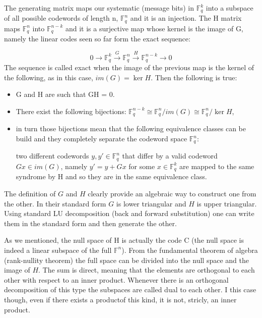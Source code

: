 \begin{info}
The generating matrix maps our systematic (message bits) in $\mathbb{F}_{q}^{k}$ into a subspace of all possible codewords of length n, $\mathbb{F}_{q}^{n}$  and it is an injection. The H matrix maps $\mathbb{F}_{q}^{n}$ into $\mathbb{F}_{q}^{n-k}$ and it is a surjective map whose kernel is the image of G, namely the linear codes seen so far form the exact sequence: 

\begin{equation}
	0 \rightarrow \mathbb{F}_{q}^{k} \xrightarrow{G} \mathbb{F}_{q}^{n} \xrightarrow{H} \mathbb{F}_{q}^{n-k} \longrightarrow 0
\end{equation}
The sequence is called exact when the image of the previous map is the kernel of the following, as in this case, $im(G) = \ker H$. Then the following is true:
\begin{itemize}
	\item G and H are such that GH = 0.
	\item There exist the following bijections: $\mathbb{F}_{q}^{n - k} \cong \mathbb{F}_{q}^{n} / im(G) \cong \mathbb{F}_{q}^{n} / \ker H$,
	\item in turn those bijections mean that the following equivalence classes can be build and they completely separate the codeword space $\mathbb{F}_{q}^{n}$:
	
	two different codewords $y, y\prime \in \mathbb{F}_{q}^{n}$ that differ by a valid codeword $Gx \in im(G)$, namely $y\prime = y + Gx$ for some $x\in \mathbb{F}_{q}^{k}$ are mapped to the same syndrome by H and so they are in the same equivalence class.    
\end{itemize}

\end{info}

The definition of $G$ and $H$ clearly provide an algebraic way to construct one from the other. In their standard form $G$ is lower triangular and $H$ is upper triangular. Using standard LU decomposition (back and forward substitution) one can write them in the standard form and then generate the other. 

\begin{info}
	As we mentioned, the null space of H is actually the code C (the null space is indeed a linear subspace of the full $\mathbb{F}^n$). From the fundamental theorem of algebra (rank-nullity theorem) the full space can be divided into the null space and the image of $H$. The sum is direct, meaning that the elements are orthogonal to each other with respect to an inner product. Whenever there is an orthogonal decomposition of this type the subspaces are called dual to each other. I this case though, even if there exists a productof this kind, it is not, stricly, an inner product.
\end{info}

